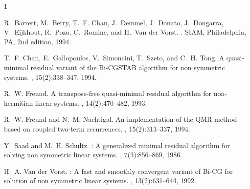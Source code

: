 \documentclass{report}
\begin{document}
\begin{thebibliography}{1}

R.~Barrett, M.~Berry, T.~F. Chan, J.~Demmel, J.~Donato, J.~Dongarra,
V.~Eijkhout, R.~Pozo, C.~Romine, and H.~{Van der Vorst}.
.
\newblock SIAM, Philadelphia, PA, 2nd edition, 1994.

T.~F. Chan, E.~Gallopoulos, V.~Simoncini, T.~Szeto, and C.~H. Tong.
\newblock A quasi-minimal residual variant of the {Bi-CGSTAB} algorithm for non
symmetric systems.
, 15(2):338--347, 1994.

R.~W. Freund.
\newblock A transpose-free quasi-minimal residual algorithm for non-hermitian
linear systems.
, 14(2):470--482, 1993.

R.~W. Freund and N.~M. Nachtigal.
\newblock An implementation of the {QMR} method based on coupled two-term
recurrences.
, 15(2):313--337, 1994.

Y.~Saad and M.~H. Schultz.
: A generalized minimal residual algorithm for solving non
symmetric linear systems.
, 7(3):856--869, 1986.

H.~A. {Van der Vorst}.
: A fast and smoothly convergent variant of {Bi-CG} for
solution of non symmetric linear systems.
, 13(2):631--644, 1992.

\end{thebibliography}
\end{document}
